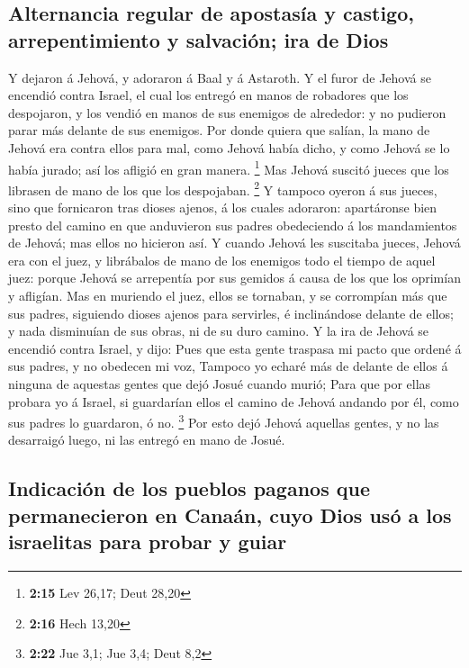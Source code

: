 \hypertarget{alternancia-regular-de-apostasuxeda-y-castigo-arrepentimiento-y-salvaciuxf3n-ira-de-dios}{%
\subsection{Alternancia regular de apostasía y castigo, arrepentimiento
y salvación; ira de
Dios}\label{alternancia-regular-de-apostasuxeda-y-castigo-arrepentimiento-y-salvaciuxf3n-ira-de-dios}}

 Y dejaron á Jehová, y adoraron á Baal y á Astaroth.
 Y el furor de Jehová se encendió contra Israel, el cual
los entregó en manos de robadores que los despojaron, y los vendió en
manos de sus enemigos de alrededor: y no pudieron parar más delante de
sus enemigos.  Por donde quiera que salían, la mano de
Jehová era contra ellos para mal, como Jehová había dicho, y como Jehová
se lo había jurado; así los afligió en gran manera. \footnote{\textbf{2:15}
  Lev 26,17; Deut 28,20}  Mas Jehová suscitó jueces que
los librasen de mano de los que los despojaban. \footnote{\textbf{2:16}
  Hech 13,20}  Y tampoco oyeron á sus jueces, sino que
fornicaron tras dioses ajenos, á los cuales adoraron: apartáronse bien
presto del camino en que anduvieron sus padres obedeciendo á los
mandamientos de Jehová; mas ellos no hicieron así.  Y
cuando Jehová les suscitaba jueces, Jehová era con el juez, y librábalos
de mano de los enemigos todo el tiempo de aquel juez: porque Jehová se
arrepentía por sus gemidos á causa de los que los oprimían y afligían.
 Mas en muriendo el juez, ellos se tornaban, y se
corrompían más que sus padres, siguiendo dioses ajenos para servirles, é
inclinándose delante de ellos; y nada disminuían de sus obras, ni de su
duro camino.  Y la ira de Jehová se encendió contra
Israel, y dijo: Pues que esta gente traspasa mi pacto que ordené á sus
padres, y no obedecen mi voz,  Tampoco yo echaré más de
delante de ellos á ninguna de aquestas gentes que dejó Josué cuando
murió;  Para que por ellas probara yo á Israel, si
guardarían ellos el camino de Jehová andando por él, como sus padres lo
guardaron, ó no. \footnote{\textbf{2:22} Jue 3,1; Jue 3,4; Deut 8,2}
 Por esto dejó Jehová aquellas gentes, y no las
desarraigó luego, ni las entregó en mano de Josué.

\hypertarget{indicaciuxf3n-de-los-pueblos-paganos-que-permanecieron-en-canauxe1n-cuyo-dios-usuxf3-a-los-israelitas-para-probar-y-guiar}{%
\subsection{Indicación de los pueblos paganos que permanecieron en
Canaán, cuyo Dios usó a los israelitas para probar y
guiar}\label{indicaciuxf3n-de-los-pueblos-paganos-que-permanecieron-en-canauxe1n-cuyo-dios-usuxf3-a-los-israelitas-para-probar-y-guiar}}

